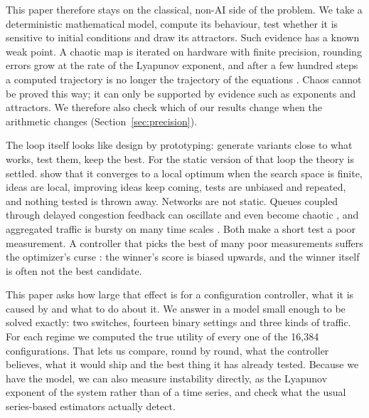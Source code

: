 \documentclass[11pt,a4paper]{article}
\begin{document}
This paper therefore stays on the classical, non-AI side of the problem. We take a deterministic mathematical model, compute its behaviour, test whether it is sensitive to initial conditions and draw its attractors. Such evidence has a known weak point. A chaotic map is iterated on hardware with finite precision, rounding errors grow at the rate of the Lyapunov exponent, and after a few hundred steps a computed trajectory is no longer the trajectory of the equations \citep{hammel1987numerical}. Chaos cannot be proved this way; it can only be supported by evidence such as exponents and attractors. We therefore also check which of our results change when the arithmetic changes (Section~\ref{sec:precision}).

The loop itself looks like design by prototyping: generate variants close to what works, test them, keep the best. For the static version of that loop the theory is settled. \citet{kuras2026when} show that it converges to a local optimum when the search space is finite, ideas are local, improving ideas keep coming, tests are unbiased and repeated, and nothing tested is thrown away. Networks are not static. Queues coupled through delayed congestion feedback can oscillate and even become chaotic \citep{ranjan2004nonlinear,chen2004controlling,guo2008hopf}, and aggregated traffic is bursty on many time scales \citep{leland1994selfsimilar,willinger1997selfsim}. Both make a short test a poor measurement. A controller that picks the best of many poor measurements suffers the optimizer's curse \citep{smithwinkler2006}: the winner's score is biased upwards, and the winner itself is often not the best candidate.

This paper asks how large that effect is for a configuration controller, what it is caused by and what to do about it. We answer in a model small enough to be solved exactly: two switches, fourteen binary settings and three kinds of traffic. For each regime we computed the true utility of every one of the 16,384 configurations. That lets us compare, round by round, what the controller believes, what it would ship and the best thing it has already tested. Because we have the model, we can also measure instability directly, as the Lyapunov exponent of the system rather than of a time series, and check what the usual series-based estimators actually detect.
\end{document}
